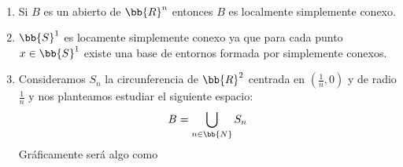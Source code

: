 \begin{ejemplo}\
    \begin{enumerate}
        \item Si $B$ es un abierto de $\bb{R}^n$ entonces $B$ es localmente simplemente conexo.

        \item $\bb{S}^1$ es locamente simplemente conexo ya que para cada punto $x\in \bb{S}^1$ existe una base de entornos formada por simplemente conexos.

        \item Consideramos $S_n$ la circunferencia de $\bb{R}^2$ centrada en $\left(\frac{1}{n}, 0\right)$ y de radio $\frac{1}{n}$ y nos planteamos estudiar el siguiente espacio:
        \begin{gather*}
            B = \bigcup\limits_{n\in \bb{N}} S_n
        \end{gather*}
        Gráficamente será algo como
        \begin{figure}[H]
            \centering
        \end{figure}


\end{enumerate}
\end{ejemplo}

